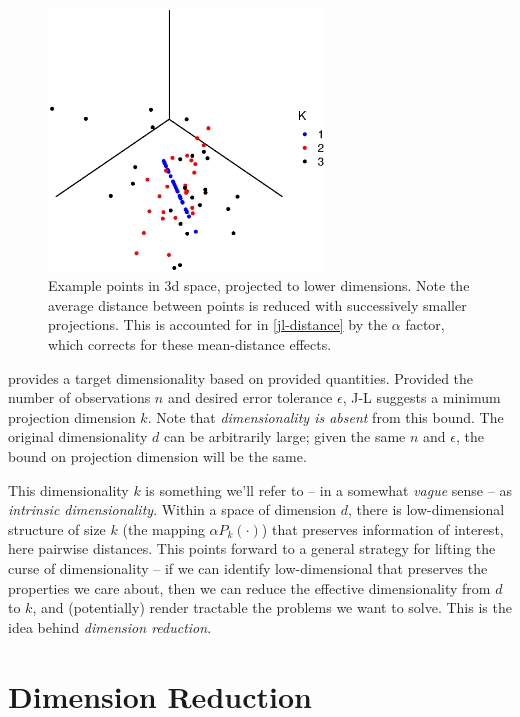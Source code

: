 \documentclass{article}
\begin{document}
\begin{figure}[!ht]
  \centering
  \includegraphics[width=0.65\textwidth]{../../images/dim_proj1}
  \caption{Example points in 3d space, projected to lower dimensions. Note the
    average distance between points is reduced with successively smaller
    projections. This is accounted for in \eqref{jl-distance} by the $\alpha$
    factor, which corrects for these mean-distance effects.}
  \label{fig:jl-avg-distance}
\end{figure}

 provides a target dimensionality based on provided
quantities. Provided the number of observations $n$ and desired error tolerance
$\epsilon$, J-L suggests a minimum projection dimension $k$. Note that
\emph{dimensionality is absent} from this bound. The original dimensionality $d$
can be arbitrarily large; given the same $n$ and $\epsilon$, the bound on
projection dimension will be the same.

This dimensionality $k$ is something we'll refer to -- in a somewhat
\emph{vague} sense -- as \emph{intrinsic dimensionality}. Within a space of
dimension $d$, there is low-dimensional structure of size $k$ (the mapping
$\alpha P_k(\cdot)$) that preserves information of interest, here pairwise
distances. This points forward to a general strategy for lifting the curse of
dimensionality -- if we can identify low-dimensional that preserves the
properties we care about, then we can reduce the effective dimensionality from
$d$ to $k$, and (potentially) render tractable the problems we want to solve.
This is the idea behind \emph{dimension reduction}.

\section{Dimension Reduction}
\end{document}
